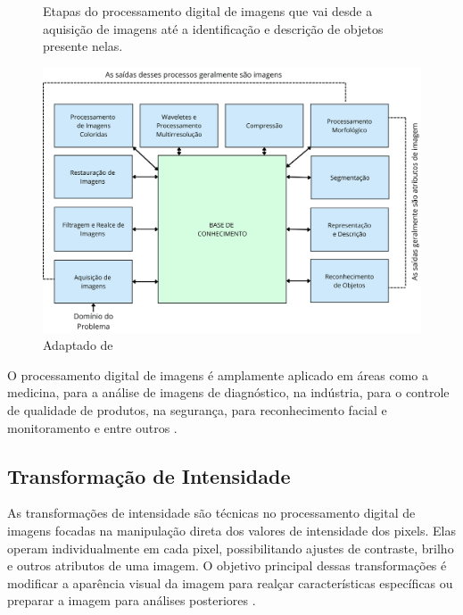 \begin{figure}
    \centering 
    \caption{Etapas do processamento digital de imagens que vai desde a aquisição de imagens até a identificação e descrição de objetos presente nelas.}  
    \includegraphics[width=\textwidth]{fig/capsgonza.png}
    \caption*{Adaptado de }
    \label{etapasProcessamentoImagens}
\end{figure}

O processamento digital de imagens é amplamente aplicado em áreas como a medicina, para a análise de imagens de diagnóstico, na indústria, para o controle de qualidade de produtos, na segurança, para reconhecimento facial e monitoramento e entre outros \cite{gonzalez2010processamento}. %




\subsection{Transformação de Intensidade}


As transformações de intensidade são técnicas no processamento digital de imagens focadas na manipulação direta dos valores de intensidade dos pixels. Elas operam individualmente em cada pixel, possibilitando ajustes de contraste, brilho e outros atributos de uma imagem. O objetivo principal dessas transformações é modificar a aparência visual da imagem para realçar características específicas ou preparar a imagem para análises posteriores \cite{gonzalez2010processamento}.


